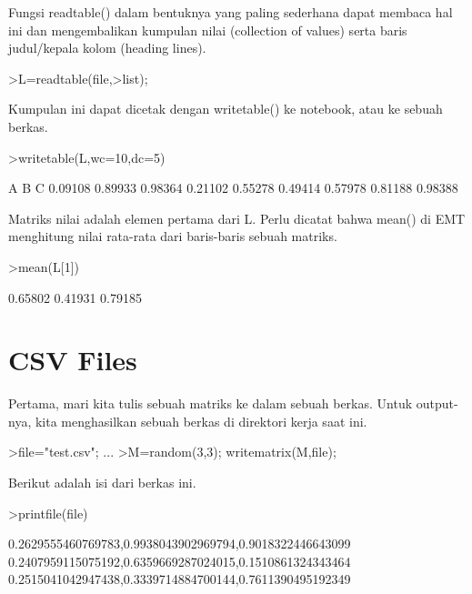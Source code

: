 \documentclass{article}
\newenvironment{eulernotebook}{\par}{\par}
\newcommand{\eulerheading}[1]{\section{#1}}
\newenvironment{eulercomment}{\par\medskip}{\par\medskip}
\begin{document}
\begin{eulernotebook}
\begin{eulercomment}
\begin{eulercomment}
\begin{eulercomment}
\begin{eulercomment}
\begin{eulercomment}
\begin{eulercomment}
\begin{euleroutput}
\end{euleroutput}
\begin{eulercomment}
Fungsi readtable() dalam bentuknya yang paling sederhana dapat membaca
hal ini dan mengembalikan kumpulan nilai (collection of values) serta
baris judul/kepala kolom (heading lines).
\end{eulercomment}
\begin{eulerprompt}
>L=readtable(file,>list);
\end{eulerprompt}
\begin{eulercomment}
Kumpulan ini dapat dicetak dengan writetable() ke notebook, atau ke
sebuah berkas.
\end{eulercomment}
\begin{eulerprompt}
>writetable(L,wc=10,dc=5)
\end{eulerprompt}
\begin{euleroutput}
           A         B         C
     0.09108   0.89933   0.98364
     0.21102   0.55278   0.49414
     0.57978   0.81188   0.98388
\end{euleroutput}
\begin{eulercomment}
Matriks nilai adalah elemen pertama dari L. Perlu dicatat bahwa mean()
di EMT menghitung nilai rata-rata dari baris-baris sebuah matriks.
\end{eulercomment}
\begin{eulerprompt}
>mean(L[1])
\end{eulerprompt}
\begin{euleroutput}
    0.65802 
    0.41931 
    0.79185 
\end{euleroutput}
\eulerheading{CSV Files}
\begin{eulercomment}
Pertama, mari kita tulis sebuah matriks ke dalam sebuah berkas. Untuk
output-nya, kita menghasilkan sebuah berkas di direktori kerja saat
ini.
\end{eulercomment}
\begin{eulerprompt}
>file="test.csv";  ...
>M=random(3,3); writematrix(M,file);
\end{eulerprompt}
\begin{eulercomment}
Berikut adalah isi dari berkas ini.
\end{eulercomment}
\begin{eulerprompt}
>printfile(file)
\end{eulerprompt}
\begin{euleroutput}
  0.2629555460769783,0.9938043902969794,0.9018322446643099
  0.2407959115075192,0.6359669287024015,0.1510861324343464
  0.2515041042947438,0.3339714884700144,0.7611390495192349
  

\end{euleroutput}
\end{eulercomment}
\end{eulercomment}
\end{eulercomment}
\end{eulercomment}
\end{eulercomment}
\end{eulercomment}
\end{eulernotebook}
\end{document}
